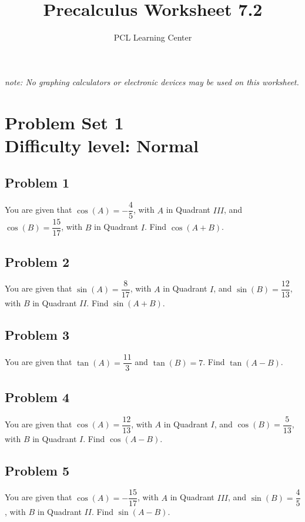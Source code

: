 \documentclass[12pt]{article}
\title{Precalculus Worksheet 7.2}
\author{PCL Learning Center}
\date{}
\begin{document}
\maketitle

\begin{center}
    \textit{note: No graphing calculators or electronic devices may be used on this worksheet.}    
\end{center}

\section*{Problem Set 1\\Difficulty level: Normal}

\subsection*{Problem 1}
You are given that \(\cos(A)=-\dfrac{4}{5}\), with \(A\) in Quadrant \(III\), and \(\cos(B)=\dfrac{15}{17}\), with \(B\) in Quadrant \(I\). Find \(\cos(A+B)\).

\subsection*{Problem 2}
You are given that \(\sin(A)=\dfrac{8}{17}\), with \(A\) in Quadrant \(I\), and \(\sin(B)=\dfrac{12}{13}\), with \(B\) in Quadrant \(II\). Find \(\sin(A+B)\).

\subsection*{Problem 3}
You are given that \(\tan(A)=\dfrac{11}{3}\) and \(\tan(B)=7\). Find \(\tan(A-B)\).

\subsection*{Problem 4}
You are given that \(\cos(A)=\dfrac{12}{13}\), with \(A\) in Quadrant \(I\), and \(\cos(B)=\dfrac{5}{13}\), with \(B\) in Quadrant \(I\). Find \(\cos(A-B)\).

\subsection*{Problem 5}
You are given that \(\cos(A)=-\dfrac{15}{17}\), with \(A\) in Quadrant \(III\), and \(\sin(B)=\dfrac{4}{5}\), with \(B\) in Quadrant \(II\). Find \(\sin(A-B)\).
\end{document}
